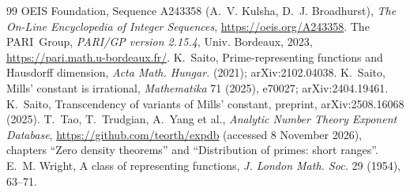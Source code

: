 \documentclass[11pt,a4paper]{article}
\theoremstyle{definition}
\begin{document}
\begin{thebibliography}{99}
 OEIS Foundation, Sequence A243358 (A.~V. Kulsha, D.~J. Broadhurst), \emph{The On-Line Encyclopedia of Integer Sequences}, \url{https://oeis.org/A243358}.
 The PARI~Group, \emph{PARI/GP version 2.15.4}, Univ. Bordeaux, 2023, \url{https://pari.math.u-bordeaux.fr/}.
 K.~Saito, Prime-representing functions and Hausdorff dimension, \emph{Acta Math. Hungar.} (2021); arXiv:2102.04038.
 K.~Saito, Mills' constant is irrational, \emph{Mathematika} 71 (2025), e70027; arXiv:2404.19461.
 K.~Saito, Transcendency of variants of Mills' constant, preprint, arXiv:2508.16068 (2025).
 T.~Tao, T.~Trudgian, A.~Yang et al., \emph{Analytic Number Theory Exponent Database}, \url{https://github.com/teorth/expdb} (accessed 8 November 2026), chapters ``Zero density theorems'' and ``Distribution of primes: short ranges''.
 E.~M. Wright, A class of representing functions, \emph{J. London Math. Soc.} 29 (1954), 63--71.
\end{thebibliography}
\end{document}
